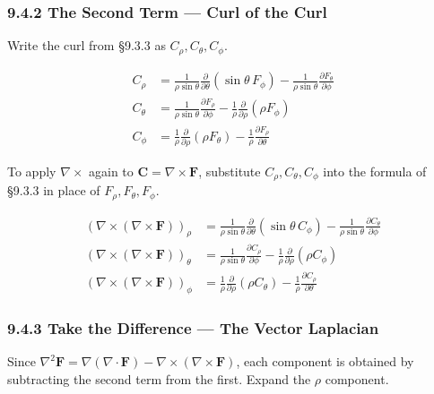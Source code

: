 \hypertarget{the-second-term-curl-of-the-curl}{%
\subsubsection{9.4.2 The Second Term --- Curl of the
Curl}\label{the-second-term-curl-of-the-curl}}

Write the curl from §9.3.3 as \(C_\rho, C_\theta, C_\phi\).

\[\begin{aligned}
C_\rho &= \frac{1}{\rho\sin\theta}\frac{\partial}{\partial\theta}(\sin\theta\,F_\phi) - \frac{1}{\rho\sin\theta}\frac{\partial F_\theta}{\partial\phi} \\[0.3em]
C_\theta &= \frac{1}{\rho\sin\theta}\frac{\partial F_\rho}{\partial\phi} - \frac{1}{\rho}\frac{\partial}{\partial\rho}(\rho F_\phi) \\[0.3em]
C_\phi &= \frac{1}{\rho}\frac{\partial}{\partial\rho}(\rho F_\theta) - \frac{1}{\rho}\frac{\partial F_\rho}{\partial\theta}
\end{aligned}\]

To apply \(\nabla\times\) again to
\(\mathbf{C} = \nabla\times\mathbf{F}\), substitute
\(C_\rho, C_\theta, C_\phi\) into the formula of §9.3.3 in place of
\(F_\rho, F_\theta, F_\phi\).

\[\begin{aligned}
(\nabla\times(\nabla\times\mathbf{F}))_\rho &= \frac{1}{\rho\sin\theta}\frac{\partial}{\partial\theta}(\sin\theta\,C_\phi) - \frac{1}{\rho\sin\theta}\frac{\partial C_\theta}{\partial\phi} \\[0.5em]
(\nabla\times(\nabla\times\mathbf{F}))_\theta &= \frac{1}{\rho\sin\theta}\frac{\partial C_\rho}{\partial\phi} - \frac{1}{\rho}\frac{\partial}{\partial\rho}(\rho C_\phi) \\[0.5em]
(\nabla\times(\nabla\times\mathbf{F}))_\phi &= \frac{1}{\rho}\frac{\partial}{\partial\rho}(\rho C_\theta) - \frac{1}{\rho}\frac{\partial C_\rho}{\partial\theta}
\end{aligned}\]

\hypertarget{take-the-difference-the-vector-laplacian}{%
\subsubsection{9.4.3 Take the Difference --- The Vector
Laplacian}\label{take-the-difference-the-vector-laplacian}}

Since
\(\nabla^2\mathbf{F} = \nabla(\nabla\cdot\mathbf{F}) - \nabla\times(\nabla\times\mathbf{F})\),
each component is obtained by subtracting the second term from the
first. Expand the \(\rho\) component.

